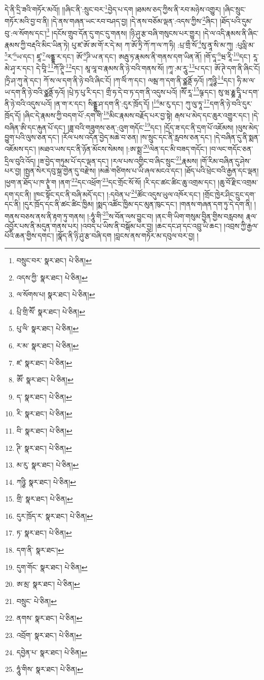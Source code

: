 དེ་ནི་དྲི་ཟའི་གཏོར་མའོ།། །།ཞིང་ནི་:སྲུང་བར་\footnote{བསྲུང་བར་  སྣར་ཐང་།  པེ་ཅིན། }བྱེད་པ་དག །ཐམས་ཅད་ཀྱིས་ནི་རབ་མཉེས་འགྱུར། །ཞིང་སྲུང་གཏོར་མའི་བྱ་བ་ནི། །དེ་ནས་གཞན་ཡང་རབ་བཤད་བྱ། །དེ་ནས་བཅོམ་ལྡན་:འདས་ཀྱིས་\footnote{འདས་ཀྱི་  སྣར་ཐང་།  པེ་ཅིན། }ཞིང་། །ཐོད་པའི་དུམ་བུ་:ལ་སོགས་དང་།\footnote{ལ་སོགས་པ།  སྣར་ཐང་།  པེ་ཅིན། } །དངོས་གྲུབ་དོན་དུ་གང་དུ་གནས། །ཉི་ཤུ་རྩ་བཞི་གསུངས་པར་གྱུར། །དེ་ལ་འདི་རྣམས་ནི་ཞིང་རྣམས་ཀྱི་བརྡའི་མིང་ཡིན་ཏེ། པུ་ཛ་ཨོ་ཨ་གོ་ར་དེ་མ། ཀ་ཨོ་ཏྲི་ཀོ་ཀ་ལ་ཀ་ཧི། :པྲ་གྲྀ་སོ་\footnote{པྲི་གྲི་སཽ་  སྣར་ཐང་།  པེ་ཅིན། }སུ་ནཱ་སི་མ་ཀུ། :པུལླི་མ་\footnote{པུ་ལི་  སྣར་ཐང་།  པེ་ཅིན། }ར་\footnote{ར་མ་  སྣར་ཐང་།  པེ་ཅིན། }ཡ་དང་། ཛཱ་\footnote{ཛ་  སྣར་ཐང་།  པེ་ཅིན། }ལནྡྷ་ར་དང་། ཨོ་\footnote{ཨཽ་  སྣར་ཐང་།  པེ་ཅིན། }ཌི་ཡ་ན་དང་། ཨརྦུ་ཏ་རྣམས་ནི་གནས་དག་ཡིན་ནོ། །གོ་དཱ་\footnote{ད་  སྣར་ཐང་།  པེ་ཅིན། }ཝ་རཱི་\footnote{རི་  སྣར་ཐང་།  པེ་ཅིན། }དང་། རཱ་མེ་ཤྭ་ར་དང་། དེ་བཱི་\footnote{བི་  སྣར་ཐང་།  པེ་ཅིན། }ཀོ་ཊཱི་\footnote{ཊི་  སྣར་ཐང་།  པེ་ཅིན། }དང་། མཱ་ལཱ་བ་རྣམས་ནི་ཉེ་བའི་གནས་སོ། །ཀཱ་:མ་རཱུ་\footnote{མ་རུ་  སྣར་ཐང་།  པེ་ཅིན། }པ་དང་། ཨོ་ཊེ་དག་ནི་ཞིང་ངོ། །ཏྲི་ཤ་ཀུ་ནེ་དང་། ཀོ་ས་ལ་དག་ནི་ཉེ་བའི་ཞིང་ངོ། །ཀ་ལིཾ་ཀ་དང་། ལམྦ་ཀ་དག་ནི་ཙྪནྡོ་ཧའོ། །ཀཱཉྩི་\footnote{ཀཉྩི་  སྣར་ཐང་།  པེ་ཅིན། }དང་། ཧི་མ་ལ་ཡ་དག་ནི་ཉེ་བའི་ཙྪནྡོ་ཧའོ། །པྲེ་ཏ་པུ་རི་དང་། གྲྀ་ཧ་དེ་བ་ཏ་དག་ནི་འདུས་པའོ། །སཽ་རཱ་\footnote{གྲི་  སྣར་ཐང་།  པེ་ཅིན། }ཥྚ་དང་། སུ་ཝ་རྞྞ་དྭཱི་པ་དག་ནི་ཉེ་བའི་འདུས་པའོ། །ན་ག་ར་དང་། སིནྡྷུ་ཤ་དག་ནི་:དུར་ཁྲོད་དོ། །\footnote{དུར་ཁྲོད་ར་  སྣར་ཐང་།  པེ་ཅིན། }མ་རུ་དང་། ཀུ་ལུ་ཏཱ་\footnote{ཏ་  སྣར་ཐང་།  པེ་ཅིན། }དག་ནི་ཉེ་བའི་དུར་ཁྲོད་དོ། །ཞིང་དེ་རྣམས་ཀྱི་བདག་པོ་:དག་གི་\footnote{དག་ནི་  སྣར་ཐང་། }མིང་རྣམས་བརྗོད་པར་བྱ་སྟེ། རྒས་པ་མེད་དང་ཆུར་འགྱུར་དང་། །དེ་བཞིན་ཨི་དང་རྐུན་པོ་དང་། །ཟླ་བའི་གཟུགས་ཅན་:འུག་གདོང་\footnote{དུག་གོང་  སྣར་ཐང་།  པེ་ཅིན། }དང་། །དྲོད་ཟ་དང་ནི་དྲག་པོ་འཇོམས། །ལུས་མེད་བྱུག་པའི་ལུས་ཅན་དང་། །རོལ་པས་འདོན་བྱེད་མཆེ་བ་ཅན། །ས་སྲུང་དང་ནི་རླབས་ཅན་དང་། །དེ་བཞིན་དུ་ནི་སྨན་འཇོམས་དང་། །མཐའ་ཡས་དང་ནི་ཉོན་མོངས་སེམས། །:ཨ་སྨྲ་\footnote{ཨ་མྲ་  སྣར་ཐང་།  པེ་ཅིན། }ལེན་དང་མི་བཟད་གདོང་། །བ་ལང་གདོང་ཅན་དྲིལ་བུའི་འོད། །ཟ་བྱེད་གཏུམ་པོ་དང་ལྡན་དང་། །རལ་པས་འགྱིང་བ་ཞིང་སྲུང་\footnote{བསྲུང་  པེ་ཅིན། }རྣམས། །གོ་རིམ་བཞིན་དུ་ཤེས་པར་བྱ། །སྤྱན་སེར་དབུ་སྐྲ་གྱེན་དུ་བརྫེས། །མཆེ་གཙིགས་པ་ཡི་ཞལ་མངའ་དང་། །ཐོད་པའི་ཕྲེང་བའི་རྒྱན་དང་ལྡན། །ཕྱག་ན་ཐོད་པ་ཁ་ཊྭཱཾ་ག །ནག་\footnote{ནགས་  སྣར་ཐང་།  པེ་ཅིན། }དང་འཕྲོག་\footnote{འབྲོག་  སྣར་ཐང་།  པེ་ཅིན། }དང་གྲོང་སོ་སོ། །རི་དང་ཚང་ཚིང་ཆུ་འགྲམ་དང་། །ཆུ་བོ་རྫིང་འགྲམ་དག་དང་ནི། །ཁང་སྟོང་དང་ནི་བཞི་མདོ་དང་། །:དབེན་པ་\footnote{དབྱེན་པ་  སྣར་ཐང་།  པེ་ཅིན། }ཚོང་འདུས་ཡུལ་འཁོར་དང་། །གྲོང་ཁྱེར་ཤིང་དྲུང་དག་དང་ནི། །དུར་ཁྲོད་དང་ནི་ཚང་ཚིང་ཁྱིམ། །སྨད་འཚོང་ཁྱིམ་དང་མུན་ཁུང་དང་། །གནས་གཞན་དག་ཏུ་དེ་དག་ནི། །གནས་བཅས་ནས་ནི་རྟག་ཏུ་གནས། །:ཧཱུཾ་གི་\footnote{ཧཱུཾ་གིས་  སྣར་ཐང་།  པེ་ཅིན། }ས་བོན་ལས་བྱུང་བ། །ནང་གི་ཡིག་གསུམ་བྱིན་གྱིས་བརླབས། རྣལ་འབྱོར་པས་ནི་མདུན་གནས་པར། །འབད་པ་ཡིས་ནི་བསྒོམ་པར་བྱ། །ཆང་དང་ཤ་དང་འབྲུ་ཡི་ཆང་། །འབྲས་ཀྱི་རྒྱལ་པོའི་ཆན་གྱིས་དགང་། །སྣོད་ནི་ཉི་ཤུ་རྩ་བཞི་དག །བླངས་ནས་གཏོར་མ་དབུལ་བར་བྱ། །
